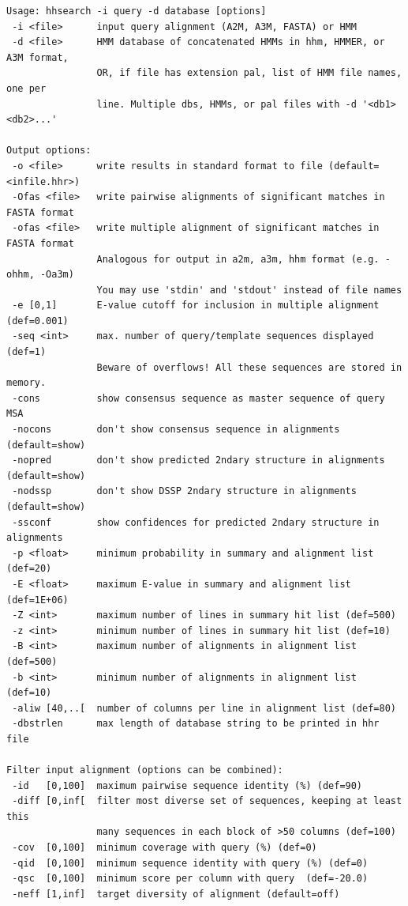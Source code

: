 \documentclass[11pt,a4paper]{article}
\begin{document}
\small 
\begin{verbatim}
Usage: hhsearch -i query -d database [options]                       
 -i <file>      input query alignment (A2M, A3M, FASTA) or HMM
 -d <file>      HMM database of concatenated HMMs in hhm, HMMER, or A3M format,
                OR, if file has extension pal, list of HMM file names, one per
                line. Multiple dbs, HMMs, or pal files with -d '<db1> <db2>...'

Output options:                                                              
 -o <file>      write results in standard format to file (default=<infile.hhr>)
 -Ofas <file>   write pairwise alignments of significant matches in FASTA format
 -ofas <file>   write multiple alignment of significant matches in FASTA format
                Analogous for output in a2m, a3m, hhm format (e.g. -ohhm, -Oa3m)
                You may use 'stdin' and 'stdout' instead of file names
 -e [0,1]       E-value cutoff for inclusion in multiple alignment (def=0.001)    
 -seq <int>     max. number of query/template sequences displayed (def=1) 
                Beware of overflows! All these sequences are stored in memory.
 -cons          show consensus sequence as master sequence of query MSA 
 -nocons        don't show consensus sequence in alignments (default=show)     
 -nopred        don't show predicted 2ndary structure in alignments (default=show)
 -nodssp        don't show DSSP 2ndary structure in alignments (default=show)  
 -ssconf        show confidences for predicted 2ndary structure in alignments
 -p <float>     minimum probability in summary and alignment list (def=20)   
 -E <float>     maximum E-value in summary and alignment list (def=1E+06)       
 -Z <int>       maximum number of lines in summary hit list (def=500)         
 -z <int>       minimum number of lines in summary hit list (def=10)         
 -B <int>       maximum number of alignments in alignment list (def=500)      
 -b <int>       minimum number of alignments in alignment list (def=10)      
 -aliw [40,..[  number of columns per line in alignment list (def=80)
 -dbstrlen      max length of database string to be printed in hhr file

Filter input alignment (options can be combined):                             
 -id   [0,100]  maximum pairwise sequence identity (%) (def=90)   
 -diff [0,inf[  filter most diverse set of sequences, keeping at least this    
                many sequences in each block of >50 columns (def=100)
 -cov  [0,100]  minimum coverage with query (%) (def=0) 
 -qid  [0,100]  minimum sequence identity with query (%) (def=0) 
 -qsc  [0,100]  minimum score per column with query  (def=-20.0)
 -neff [1,inf]  target diversity of alignment (default=off)


\end{verbatim}
\end{document}
